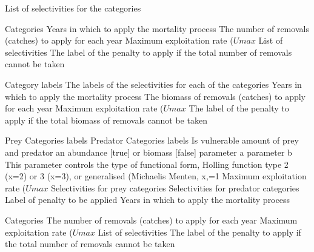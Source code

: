  {List of selectivities for the categories}
\par\textbf{}\par
{} {Categories}
 {Years in which to apply the mortality process}
 {The number of removals (catches) to apply for each year}
 {Maximum exploitation rate ($Umax$}
 {List of selectivities}
 {The label of the penalty to apply if the total number of removals cannot be taken}
\par\textbf{}\par
{} {Category labels}
 {The labels of the selectivities for each of the categories}
 {Years in which to apply the mortality process}
 {The biomass of removals (catches) to apply for each year}
 {Maximum exploitation rate ($Umax$}
 {The label of the penalty to apply if the total biomass of removals cannot be taken}
\par\textbf{}\par
{} {Prey Categories labels}
 {Predator Categories labels}
 {Is vulnerable amount of prey and predator an abundance [true] or biomass [false]}
 {parameter a}
 {parameter b}
 {This parameter controls the type of functional form, Holling function type 2 (x=2) or 3 (x=3), or generalised (Michaelis Menten, x,=1}
 {Maximum exploitation rate ($Umax$}
 {Selectivities for prey categories}
 {Selectivities for predator categories}
 {Label of penalty to be applied}
 {Years in which to apply the mortality process}
\par\textbf{}\par
{} {Categories}
 {The number of removals (catches) to apply for each year}
 {Maximum exploitation rate ($Umax$}
 {List of selectivities}
 {The label of the penalty to apply if the total number of removals cannot be taken}
\par\textbf{}\par
